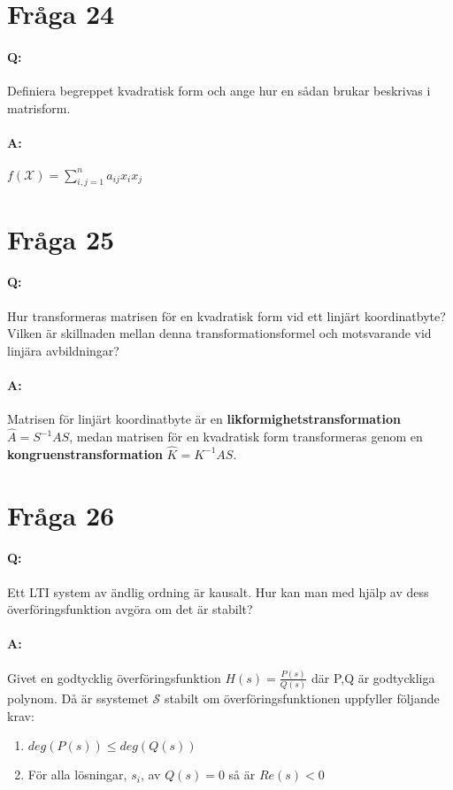 \documentclass[a4paper]{article}
\begin{document}
\section{Fråga 24}
\paragraph{Q:} Definiera begreppet kvadratisk form och ange hur en sådan brukar beskrivas i matrisform.
\paragraph{A:} $f(\mathcal{X})=\sum\limits_{i,j=1}^{n} a_{ij}x_ix_j$

\section{Fråga 25}
\paragraph{Q:} Hur transformeras matrisen för en kvadratisk form vid ett linjärt koordinatbyte? Vilken är skillnaden mellan denna transformationsformel och motsvarande vid linjära avbildningar?
\paragraph{A:} Matrisen för linjärt koordinatbyte är en \textbf{likformighetstransformation}\\ {\center $\hat{A} = S^{-1}AS$,  \endcenter} medan matrisen för en kvadratisk form transformeras genom en \textbf{kongruenstransformation} {\center $\hat{K} = K^{-1}AS$. \endcenter }

\section{Fråga 26}
\paragraph{Q:} Ett LTI system av ändlig ordning är kausalt. Hur kan man med hjälp av dess överföringsfunktion avgöra om det är stabilt? 
\paragraph{A:} Givet en godtycklig överföringsfunktion { \center $ H(s) = \frac{P(s)}{Q(s)} $ där P,Q är godtyckliga polynom. \endcenter } Då är ssystemet $\mathcal{S}$ stabilt om överföringsfunktionen uppfyller följande krav:   
\begin{enumerate}[1)]
\item $deg(P(s)) \leq deg(Q(s))$ 
\item För alla lösningar, $s_i$, av $Q(s) = 0$ så är $Re(s) < 0$
\end{enumerate}
\end{document}
